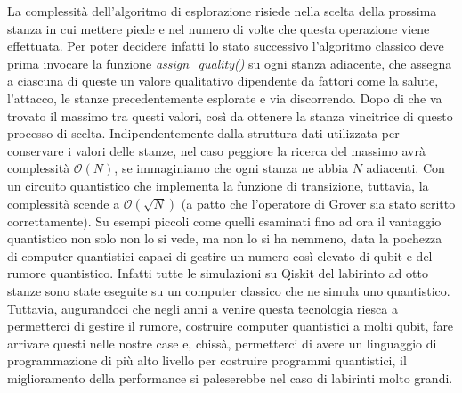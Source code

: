 \documentclass{book}
\theoremstyle{definition}
\theoremstyle{definition}
\theoremstyle{definition}
\theoremstyle{plain}
\theoremstyle{plain}
\theoremstyle{plain}
\theoremstyle{plain}
\begin{document}
\noindent La complessità dell'algoritmo di esplorazione risiede nella scelta della prossima stanza in cui mettere piede e nel numero di volte che questa operazione viene effettuata. Per poter decidere infatti lo stato successivo l'algoritmo classico deve prima invocare la funzione \textit{assign\_quality()} su ogni stanza adiacente, che assegna a ciascuna di queste un valore qualitativo dipendente da fattori come la salute, l'attacco, le stanze precedentemente esplorate e via discorrendo. Dopo di che va trovato il massimo tra questi valori, così da ottenere la stanza vincitrice di questo processo di scelta. Indipendentemente dalla struttura dati utilizzata per conservare i valori delle stanze, nel caso peggiore la ricerca del massimo avrà complessità $\mathcal{O}(N)$, se immaginiamo che ogni stanza ne abbia $N$ adiacenti. Con un circuito quantistico che implementa la funzione di transizione, tuttavia, la complessità scende a $\mathcal{O}(\sqrt{N})$ (a patto che l'operatore di Grover sia stato scritto correttamente). Su esempi piccoli come quelli esaminati fino ad ora il vantaggio quantistico non solo non lo si vede, ma non lo si ha nemmeno, data la pochezza di computer quantistici capaci di gestire un numero così elevato di qubit e del rumore quantistico. Infatti tutte le simulazioni su Qiskit del labirinto ad otto stanze sono state eseguite su un computer classico che ne simula uno quantistico. Tuttavia, augurandoci che negli anni a venire questa tecnologia riesca a permetterci di gestire il rumore, costruire computer quantistici a molti qubit, fare arrivare questi nelle nostre case e, chissà, permetterci di avere un linguaggio di programmazione di più alto livello per costruire programmi quantistici, il miglioramento della performance si paleserebbe nel caso di labirinti molto grandi.\\
\end{document}
